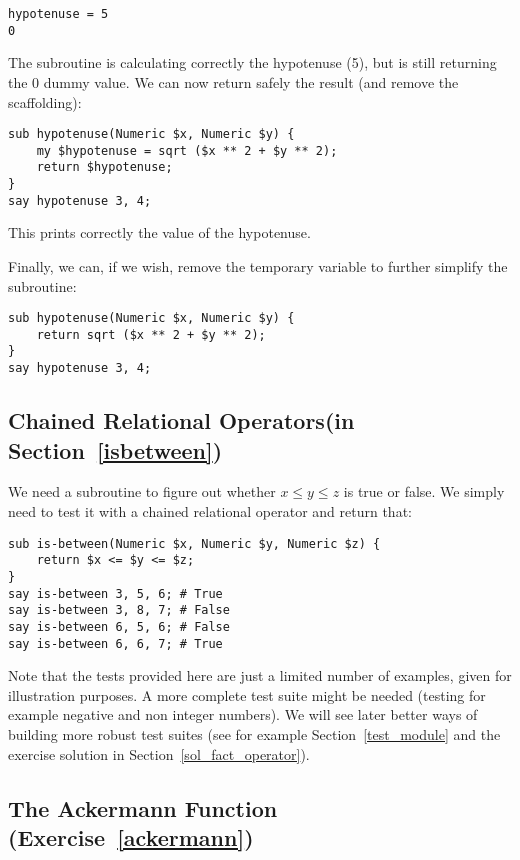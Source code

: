 \begin{verbatim}
hypotenuse = 5
0
\end{verbatim}
%

The subroutine is calculating correctly the hypotenuse (5), 
but is still returning the 0 dummy value. We can now return 
safely the result (and remove the scaffolding):

\begin{verbatim}
sub hypotenuse(Numeric $x, Numeric $y) {
    my $hypotenuse = sqrt ($x ** 2 + $y ** 2);
    return $hypotenuse;
}
say hypotenuse 3, 4;
\end{verbatim}
%

This prints correctly the value of the hypotenuse.

Finally, we can, if we wish, remove the temporary variable 
to further simplify the subroutine:
\begin{verbatim}
sub hypotenuse(Numeric $x, Numeric $y) {
    return sqrt ($x ** 2 + $y ** 2);
}
say hypotenuse 3, 4;
\end{verbatim}
%

\subsection{Chained Relational Operators(in Section~\ref{isbetween})}
\label{sol_isbetween}

We need a subroutine to figure out whether $x \le y \le z$ 
is true or false. We simply need to test it with a chained relational operator and return that:

\begin{verbatim}
sub is-between(Numeric $x, Numeric $y, Numeric $z) {
    return $x <= $y <= $z;
}
say is-between 3, 5, 6; # True
say is-between 3, 8, 7; # False
say is-between 6, 5, 6; # False
say is-between 6, 6, 7; # True
\end{verbatim}
%

Note that the tests provided here are just a limited number of 
examples, given for illustration purposes. A more complete test 
suite might be needed (testing for example negative and non 
integer numbers). We will see later better ways 
of building more robust test suites (see for example 
Section~\ref{test_module} and the exercise 
solution in Section~\ref{sol_fact_operator}).


\subsection{The Ackermann Function (Exercise~\ref{ackermann})}
\label{sol_ackermann}

